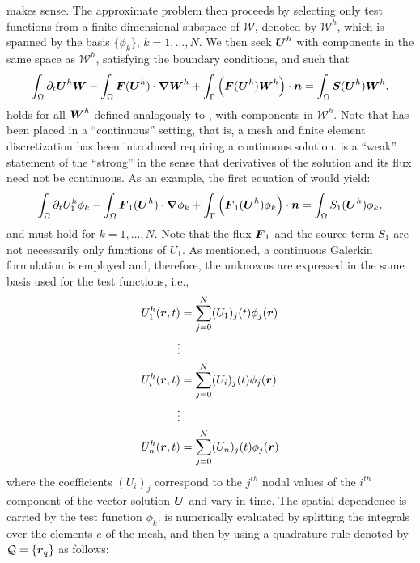 makes sense.
%
The approximate problem then proceeds by selecting only test functions
from a finite-dimensional subspace of $\mathcal{W}$, denoted by
$\mathcal {W}^h$, which is spanned by the basis $\{\phi_k\}$,
$k=1,\ldots,N$.  We then seek $\boldsymbol U^h$ with components in the same
space as $\mathcal{W}^h$, satisfying the boundary conditions, and such
that
\begin{align}
  \label{en:va_system_weak3}
  \int_\Omega \partial_t \boldsymbol U^h \boldsymbol W -   \int_\Omega \boldsymbol F(\boldsymbol U^h) \cdot \boldsymbol{\nabla} \boldsymbol W^h 
+ \int_\Gamma \left( \boldsymbol F(\boldsymbol U^h)  \boldsymbol W^h \right) \cdot \boldsymbol n   =  \int_{\Omega}  \boldsymbol S(\boldsymbol U^h)  \boldsymbol W^h,
\end{align}
holds for all $\boldsymbol W^h$ defined analogously to ,
with components in $\mathcal{W}^h$. Note that 
has been placed in a ``continuous'' setting, that is, a mesh and finite element
discretization has been introduced requiring a continuous solution.  
 is a ``weak'' statement of the ``strong'' 
 in the sense that derivatives of the  
solution and its flux need not be continuous. 
As an example, the first equation of  would yield:
%
\begin{align}
  \label{en:va_system_weak4}
  \int_\Omega \partial_t U_1^h \phi_k -   \int_\Omega \boldsymbol F_1(\boldsymbol U^h) \cdot \boldsymbol{\nabla} \phi_k 
+ \int_\Gamma \left( \boldsymbol F_1(\boldsymbol U^h) \phi_k \right) \cdot \boldsymbol n   =  \int_{\Omega} S_1(\boldsymbol U^h) \phi_k,
\end{align}
%
and must hold for $k=1,\ldots,N$. Note that the flux $\boldsymbol F_1$ and the source term $S_1$ are not necessarily only functions of $U_1$.
As mentioned, a continuous
Galerkin formulation is employed and, therefore, the unknowns are expressed in
the same basis used for the test functions, i.e.,
\begin{align}\label{en:va_system_weak4b}
  U_1^h(\boldsymbol r, t) &= \sum_{j=0}^N (U_1)_j(t) \phi_j(\boldsymbol r)
  \\
    \vdots  \nonumber\\
  U_i^h(\boldsymbol r, t) &= \sum_{j=0}^N (U_i)_j(t) \phi_j(\boldsymbol r)
  \\
  \vdots  \nonumber\\
  U_n^h(\boldsymbol r, t) &= \sum_{j=0}^N (U_n)_j(t) \phi_j(\boldsymbol r)
\end{align}
where the coefficients $(U_i)_j$ correspond to the $j^{th}$ nodal values of the $i^{th}$ component of the vector solution $\boldsymbol U$ and vary in time. The spatial dependence is carried by the test function $\phi_k$.  is numerically evaluated by splitting the integrals over the elements $e$ of the mesh, and then by using a quadrature rule denoted by $\mathcal{Q} = \left\{ \boldsymbol r_q \right\}$ as follows:
